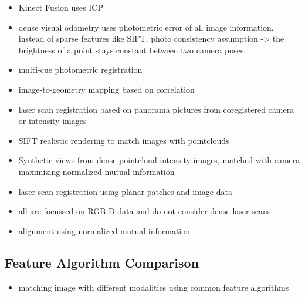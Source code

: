 \begin{itemize}
    \item Kinect Fusion uses ICP\cite{newcombe_ismar2011}
    \item dense visual odometry uses photometric error of all image information, instead of sparse features like SIFT\cite{kerl_icra2013}, photo consistency assumption -> the brightness of a point stays constant between two camera poses.
    \item multi-cue photometric registration\cite{corte_icra2018}
    \item image-to-geometry mapping based on correlation\cite{corsini_cgf2009}
    \item laser scan registration based on panorama pictures from coregistered camera or intensity images\cite{alba_isprs2012}
    \item SIFT realistic rendering to match images with pointclouds\cite{sibbing_3dv2013}
    \item Synthetic views from dense pointcloud intensity images, matched with camera maximizing normalized mutual information\cite{wolcott_iros2014,zhao_icra2016}
    \item laser scan registration using planar patches and image data\cite{dold_iaprs2006}
    \item all are focussed on RGB-D data and do not consider dense laser scans
    \item alignment using normalized mutual information
\end{itemize}

\subsection{Feature Algorithm Comparison}

\begin{itemize}
    \item matching image with different modalities using common feature algorithms\cite{gesto-diaz_2017}
\end{itemize}
